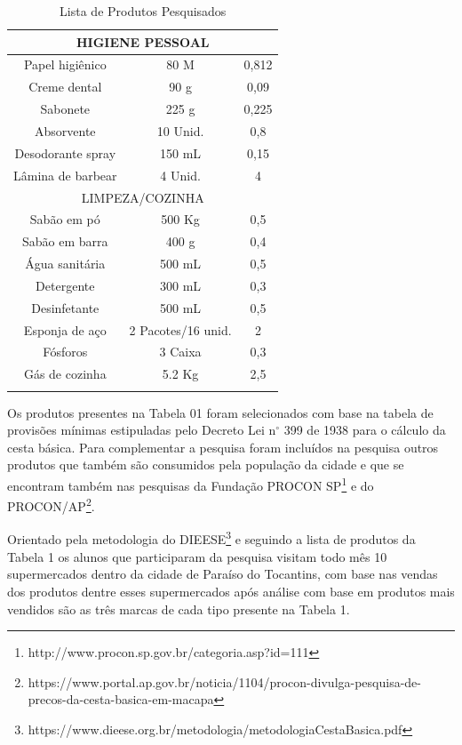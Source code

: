 \documentclass{ifto-tex}
\begin{document}
\begin{longtable}{|c|c|c|}
	\hline
	\multicolumn{3}{|c|}{HIGIENE PESSOAL}                      \\
	\hline
	Papel higiênico   & 80 M               & 0,812           \\
	\hline
	Creme dental      & 90 g               & 0,09            \\
	\hline
	Sabonete          & 225 g              & 0,225           \\
	\hline
	Absorvente        & 10 Unid.           & 0,8             \\
	\hline
	Desodorante spray & 150 mL             & 0,15            \\
	\hline
	Lâmina de barbear & 4 Unid.            & 4               \\
	\hline
	\multicolumn{3}{|c|}{LIMPEZA/COZINHA}                      \\
	\hline
	Sabão em pó       & 500 Kg             & 0,5             \\
	\hline
	Sabão em barra    & 400 g              & 0,4             \\
	\hline
	Água sanitária    & 500 mL             & 0,5             \\
	\hline
	Detergente        & 300 mL             & 0,3             \\
	\hline
	Desinfetante      & 500 mL             & 0,5             \\
	\hline
	Esponja de aço    & 2 Pacotes/16 unid. & 2               \\
	\hline
	Fósforos          & 3 Caixa            & 0,3             \\
	\hline
	Gás de cozinha    & 5.2 Kg             & 2,5       \\
	\hline     
	\caption{Lista de Produtos Pesquisados}
\end{longtable}

Os produtos presentes na Tabela 01 foram selecionados com base na tabela de provisões mínimas estipuladas pelo Decreto Lei n$^{\circ}$ 399 de 1938 para o cálculo da cesta básica. Para complementar a pesquisa foram incluídos na pesquisa outros produtos que também são consumidos pela população da cidade e que se encontram também nas pesquisas da Fundação PROCON SP\footnote{http://www.procon.sp.gov.br/categoria.asp?id=111} e do PROCON/AP\footnote{https://www.portal.ap.gov.br/noticia/1104/procon-divulga-pesquisa-de-precos-da-cesta-basica-em-macapa}.

Orientado pela metodologia do DIEESE\footnote{https://www.dieese.org.br/metodologia/metodologiaCestaBasica.pdf} e seguindo a lista de produtos da Tabela 1 os alunos que participaram da pesquisa visitam todo mês 10 supermercados dentro da cidade de Paraíso do Tocantins, com base nas vendas dos produtos dentre esses supermercados após análise com base em produtos mais vendidos são as três marcas de cada tipo presente na Tabela 1.
\end{document}
